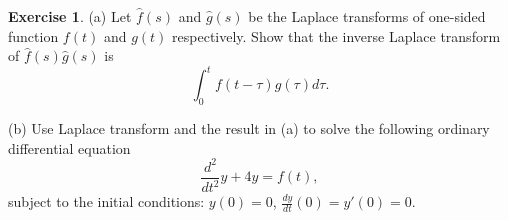\documentclass[12pt]{article}
\theoremstyle{definition}
\newtheorem{exer}{Exercise}
\theoremstyle{remark}
\begin{document}
\begin{exer}
    (a) Let $\hat{f}(s)$ and $\hat{g}(s)$ be the Laplace transforms of one-sided function $f(t)$ and $g(t)$ respectively. Show that the inverse Laplace transform of $\hat{f}(s)\hat{g}(s)$ is
\begin{equation*}
    \int_{0}^{t} f(t-\tau) g(\tau) d\tau.
\end{equation*}

(b) Use Laplace transform and the result in (a) to solve the following ordinary differential equation
\begin{equation*}
    \frac{d^{2}}{dt^{2}} y + 4y = f(t),
\end{equation*}
subject to the initial conditions: $y(0)=0$,  $\frac{dy}{dt}(0) = y'(0) = 0$.
\end{exer}
 
\end{document}
